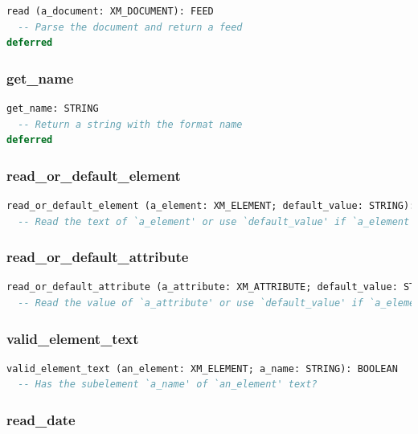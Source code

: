 \begin{lstlisting}[language=Eiffel]
read (a_document: XM_DOCUMENT): FEED
  -- Parse the document and return a feed
deferred
\end{lstlisting}

\subsubsection{get\_name}

\begin{lstlisting}[language=Eiffel]
get_name: STRING
  -- Return a string with the format name
deferred
\end{lstlisting}

\subsubsection{read\_or\_default\_element}

\begin{lstlisting}[language=Eiffel]
read_or_default_element (a_element: XM_ELEMENT; default_value: STRING): STRING
  -- Read the text of `a_element' or use `default_value' if `a_element' is Void or empty
\end{lstlisting}

\subsubsection{read\_or\_default\_attribute}

\begin{lstlisting}[language=Eiffel]
read_or_default_attribute (a_attribute: XM_ATTRIBUTE; default_value: STRING): STRING
  -- Read the value of `a_attribute' or use `default_value' if `a_element' is Void or empty
\end{lstlisting}

\subsubsection{valid\_element\_text}

\begin{lstlisting}[language=Eiffel]
valid_element_text (an_element: XM_ELEMENT; a_name: STRING): BOOLEAN
  -- Has the subelement `a_name' of `an_element' text?
\end{lstlisting}

\subsubsection{read\_date}

